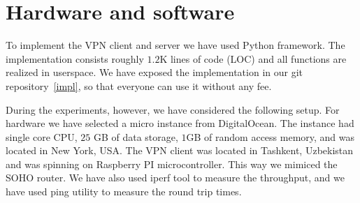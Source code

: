 \section{Hardware and software}
\label{sec:hardware}

To implement the VPN client and server we have used Python framework. The implementation
consists roughly $1.2$K lines of code (LOC) and all functions are realized in userspace.
We have exposed the implementation in our git repository~\ref{impl}, so that everyone can use it 
without any fee.

During the experiments, however, we have considered the following setup.
For hardware we have selected a micro instance from DigitalOcean. The instance had 
single core CPU, $25$ GB of data storage, $1$GB of random access memory, and was 
located in New York, USA. The VPN client was located in Tashkent, Uzbekistan and was
spinning on Raspberry PI microcontroller. This way we mimiced the SOHO router. We have 
also used iperf tool to measure the throughput, and we have used ping utility to 
measure the round trip times. 

